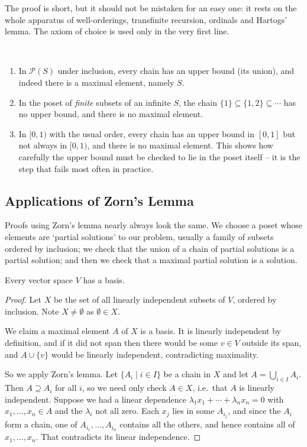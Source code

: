 \documentclass[a4paper]{scrartcl}
\begin{document}
The proof is short, but it should not be mistaken for an easy one: it rests on the whole apparatus of well-orderings, transfinite recursion, ordinals and Hartogs' lemma. The axiom of choice is used only in the very first line.

\begin{example}~
  \begin{enumerate}[label=(\roman*)]
    \item In $\mathcal{P}(S)$ under inclusion, every chain has an upper bound (its union), and indeed there is a maximal element, namely $S$.
    \item In the poset of \emph{finite} subsets of an infinite $S$, the chain $\{1\} \subseteq \{1,2\} \subseteq \cdots$ has no upper bound, and there is no maximal element.
    \item In $[0,1)$ with the usual order, every chain has an upper bound in $[0,1]$ but not always in $[0,1)$, and there is no maximal element. This shows how carefully the upper bound must be checked to lie in the poset itself -- it is the step that fails most often in practice.
  \end{enumerate}
\end{example}

\subsection{Applications of Zorn's Lemma}\label{sec:zornapps}

Proofs using Zorn's lemma nearly always look the same. We choose a poset whose elements are `partial solutions' to our problem, usually a family of subsets ordered by inclusion; we check that the union of a chain of partial solutions is a partial solution; and then we check that a maximal partial solution is a solution.

\begin{theorem}
  Every vector space $V$ has a basis.
\end{theorem}
\begin{proof}
  Let $X$ be the set of all linearly independent subsets of $V$, ordered by inclusion. Note $X \neq \emptyset$ as $\emptyset \in X$.

  We claim a maximal element $A$ of $X$ is a basis. It is linearly independent by definition, and if it did not span then there would be some $v \in V$ outside its span, and $A \cup \{v\}$ would be linearly independent, contradicting maximality.

  So we apply Zorn's lemma. Let $\{A_i \mid i \in I\}$ be a chain in $X$ and let $A = \bigcup_{i \in I} A_i$. Then $A \supseteq A_i$ for all $i$, so we need only check $A \in X$, i.e.\ that $A$ is linearly independent. Suppose we had a linear dependence $\lambda_1 x_1+\cdots+\lambda_n x_n=0$ with $x_1, \ldots, x_n \in A$ and the $\lambda_i$ not all zero. Each $x_j$ lies in some $A_{i_j}$, and since the $A_i$ form a chain, one of $A_{i_1}, \dots, A_{i_n}$ contains all the others, and hence contains all of $x_1, \dots, x_n$. That contradicts its linear independence.
\end{proof}
\end{document}
